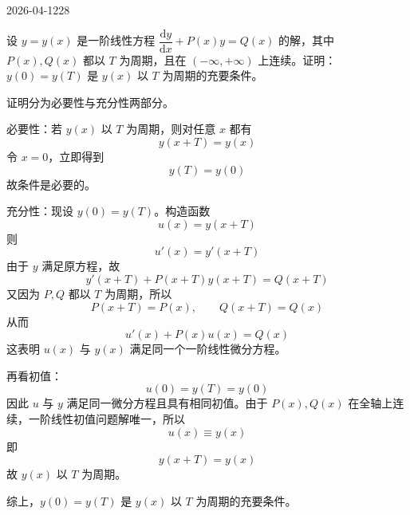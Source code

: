 \begin{mistake}{2026-04-12}{28}

\begin{problemcontent}
设 \( y=y(x) \) 是一阶线性方程 \( \dfrac{\mathrm{d}y}{\mathrm{d}x}+P(x)y=Q(x) \) 的解，其中 \( P(x),Q(x) \) 都以 \( T \) 为周期，且在 \(( -\infty,+\infty )\) 上连续。证明：\( y(0)=y(T) \) 是 \( y(x) \) 以 \( T \) 为周期的充要条件。
\end{problemcontent}

\begin{solutioncontent}
证明分为必要性与充分性两部分。

必要性：若 \(y(x)\) 以 \(T\) 为周期，则对任意 \(x\) 都有
\[
y(x+T)=y(x)
\]
令 \(x=0\)，立即得到
\[
y(T)=y(0)
\]
故条件是必要的。

充分性：现设 \(y(0)=y(T)\)。构造函数
\[
u(x)=y(x+T)
\]
则
\[
u'(x)=y'(x+T)
\]
由于 \(y\) 满足原方程，故
\[
y'(x+T)+P(x+T)y(x+T)=Q(x+T)
\]
又因为 \(P,Q\) 都以 \(T\) 为周期，所以
\[
P(x+T)=P(x),\qquad Q(x+T)=Q(x)
\]
从而
\[
u'(x)+P(x)u(x)=Q(x)
\]
这表明 \(u(x)\) 与 \(y(x)\) 满足同一个一阶线性微分方程。

再看初值：
\[
u(0)=y(T)=y(0)
\]
因此 \(u\) 与 \(y\) 满足同一微分方程且具有相同初值。由于 \(P(x),Q(x)\) 在全轴上连续，一阶线性初值问题解唯一，所以
\[
u(x)\equiv y(x)
\]
即
\[
y(x+T)=y(x)
\]
故 \(y(x)\) 以 \(T\) 为周期。

综上，\(y(0)=y(T)\) 是 \(y(x)\) 以 \(T\) 为周期的充要条件。
\end{solutioncontent}


\end{mistake}
